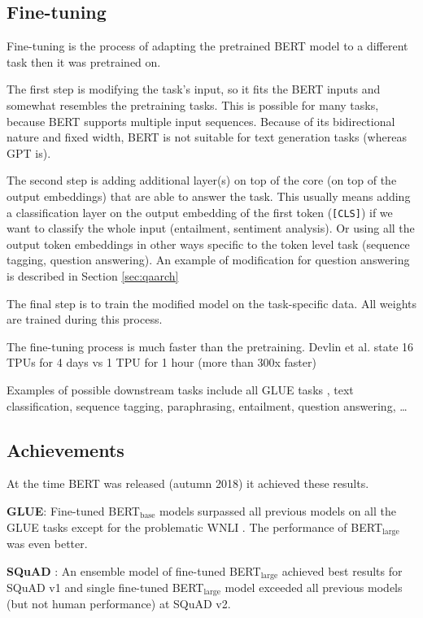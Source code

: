 \documentclass[
  printed, %
  color,   %
  table,   %
  oneside, %
  lof,     %
  lot,     %
]{fithesis3}
\begin{document}
\subsection{Fine-tuning}
Fine-tuning is the process of adapting the pretrained BERT model to a different task then it was pretrained on. 

The first step is modifying the task's input, so it fits the BERT inputs and somewhat resembles the pretraining tasks. This is possible for many tasks, because BERT supports multiple input sequences. Because of its bidirectional nature and fixed width, BERT is not suitable for text generation tasks (whereas GPT\parencite{gpt} is).

The second step is adding additional layer(s) on top of the core (on top of the output embeddings) that are able to answer the task. This usually means adding a classification layer on the output embedding of the first token (\texttt{[CLS]}) if we want to classify the whole input (entailment, sentiment analysis). Or using all the output token embeddings in other ways specific to the token level task (sequence tagging, question answering). An example of modification for question answering is described in Section \ref{sec:qaarch}

The final step is to train the modified model on the task-specific data. All weights are trained during this process.

The fine-tuning process is much faster than the pretraining.  Devlin et al. \parencite{bert} state 16 TPUs for 4 days vs 1 TPU for 1 hour (more than 300x faster)

Examples of possible downstream tasks include all GLUE tasks \parencite{glue}, text classification, sequence tagging, paraphrasing, entailment, question answering, \dots

\subsection{Achievements}
At the time BERT was released (autumn 2018) it achieved these results.

\textbf{GLUE}: Fine-tuned BERT$_\text{base}$ models surpassed all previous models on all the GLUE \parencite{glue} tasks except for the problematic WNLI \parencite[Table 1]{bert}. The performance of BERT$_\text{large}$ was even better.

\textbf{SQuAD} \parencite{squad}: An ensemble model of fine-tuned BERT$_\text{large}$ achieved best results for SQuAD v1 \parencite[Table 2]{bert} and single  fine-tuned BERT$_\text{large}$ model exceeded all previous models (but not human performance) at SQuAD v2\parencite[Table 3]{bert}. 
\end{document}
